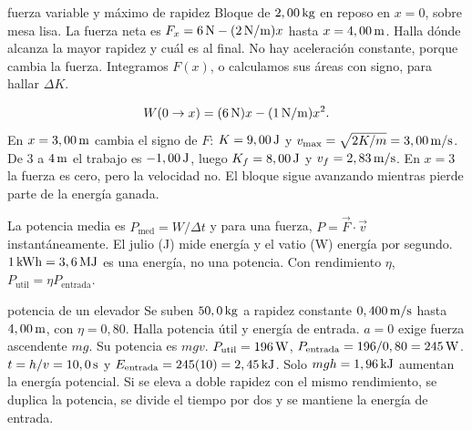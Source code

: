 \documentclass[11pt,a4paper]{article}
\begin{document}
\begin{examplebox}{fuerza variable y m\'aximo de rapidez}
 Bloque de $2,00\,\mathrm{kg}$ en reposo en $x=0$, sobre mesa lisa.
La fuerza neta es $F_x=6\,\mathrm{N}-(2\,\mathrm{N/m})x$ hasta $x=4,00\,\mathrm{m}$.
Halla d\'onde alcanza la mayor rapidez y cu\'al es al final.
\solutionblock
{} No hay aceleraci\'on constante, porque cambia la fuerza.
Integramos $F(x)$, o calculamos sus \'areas con signo, para hallar $\Delta K$.
\begin{center}
\end{center}
\[
W(0\to x)=(6\,\mathrm{N})x-(1\,\mathrm{N/m})x^2.
\]
En $x=3,00\,\mathrm{m}$ cambia el signo de $F$:
$K=9,00\,\mathrm{J}$ y $v_{\max}=\sqrt{2K/m}=3,00\,\mathrm{m/s}$.
De $3$ a $4\,\mathrm{m}$ el trabajo es $-1,00\,\mathrm{J}$, luego
$K_f=8,00\,\mathrm{J}$ y $v_f=2,83\,\mathrm{m/s}$.
 En $x=3$ la fuerza es cero, pero la velocidad no.
El bloque sigue avanzando mientras pierde parte de la energ\'ia ganada.
\end{examplebox}

La potencia media es $P_{\mathrm{med}}=W/\Delta t$ y para una fuerza,
$P=\vec F\cdot\vec v$ instant\'aneamente.
El julio (J) mide energ\'ia y el vatio (W) energ\'ia por segundo.
$1\,\mathrm{kWh}=3,6\,\mathrm{MJ}$ es una energ\'ia, no una potencia.
Con rendimiento $\eta$, $P_{\mathrm{util}}=\eta P_{\mathrm{entrada}}$.

\begin{examplebox}{potencia de un elevador}
 Se suben $50,0\,\mathrm{kg}$ a rapidez constante $0,400\,\mathrm{m/s}$
hasta $4,00\,\mathrm{m}$, con $\eta=0,80$. Halla potencia \'util y energ\'ia de entrada.
\solutionblock
{} $a=0$ exige fuerza ascendente $mg$. Su potencia es $mgv$.
 $P_{\mathrm{util}}=196\,\mathrm{W}$,
$P_{\mathrm{entrada}}=196/0,80=245\,\mathrm{W}$.
$t=h/v=10,0\,\mathrm{s}$ y $E_{\mathrm{entrada}}=245(10)=2,45\,\mathrm{kJ}$.
 Solo $mgh=1,96\,\mathrm{kJ}$ aumentan la energ\'ia potencial.
Si se eleva a doble rapidez con el mismo rendimiento, se duplica la potencia,
se divide el tiempo por dos y se mantiene la energ\'ia de entrada.
\end{examplebox}
\end{document}

